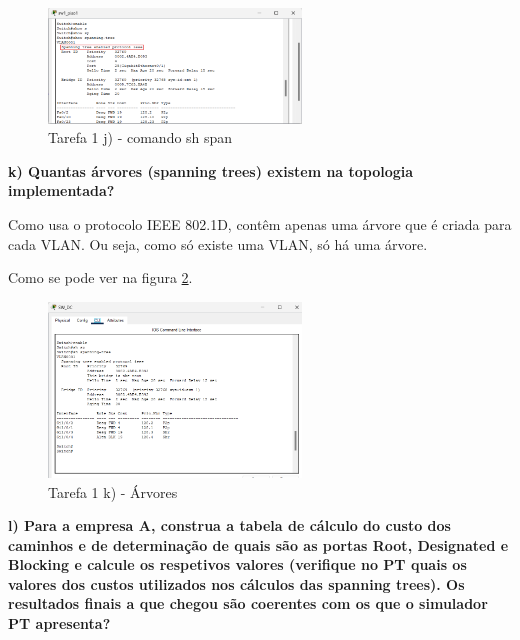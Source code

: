 \documentclass[11pt,english, openright, oneside]{book}
\begin{document}
\begin{figure}[H]
    \centering
    \includegraphics[width=0.6\textwidth]{imagens/Tarefa1/1.j.png}
    \caption{Tarefa 1 j) - comando sh span}
    \label{fig:1j}
\end{figure}

\vspace{0.8cm}

\textbf{k) Quantas árvores (spanning trees) existem na topologia implementada?}
\vspace{0.2cm}

Como usa o protocolo IEEE 802.1D, contêm apenas uma árvore que é criada para
cada VLAN. Ou seja, como só existe uma VLAN, só há uma árvore.

Como se pode ver na figura \ref{fig:1k}.
\vspace{0.4cm}

\begin{figure}[H]
    \centering
    \includegraphics[width=0.6\textwidth]{imagens/Tarefa1/1.k.png}
    \caption{Tarefa 1 k) - Árvores}
    \label{fig:1k}
\end{figure}

\vspace{0.8cm}


\textbf{l) Para a empresa A, construa a tabela de cálculo do custo dos caminhos e de determinação de quais são as portas Root, Designated e Blocking e calcule os respetivos valores (verifique no PT quais os valores dos custos utilizados nos cálculos das spanning trees). Os resultados finais a que chegou são coerentes com os que o simulador PT apresenta?}
\vspace{0.2cm}
\end{document}
